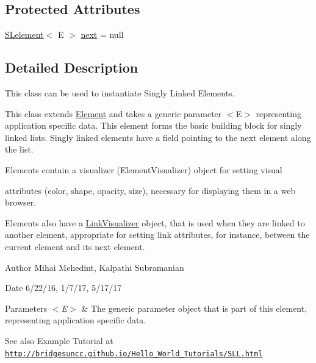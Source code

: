 \subsection*{Protected Attributes}
\begin{DoxyCompactItemize}
\item 
\hyperlink{classbridges_1_1base_1_1_s_lelement}{S\+Lelement}$<$ E $>$ \hyperlink{classbridges_1_1base_1_1_s_lelement_abf61c96a74ad319d561c6952ea388e0e}{next} = null
\end{DoxyCompactItemize}


\subsection{Detailed Description}
This class can be used to instantiate Singly Linked Elements. 

This class extends \hyperlink{classbridges_1_1base_1_1_element}{Element} and takes a generic parameter $<$\+E$>$ representing application specific data. This element forms the basic building block for singly linked lists. Singly linked elements have a field pointing to the next element along the list.

\begin{DoxyVerb}Elements contain a visualizer (ElementVisualizer) object for setting visual
\end{DoxyVerb}
 attributes (color, shape, opacity, size), necessary for displaying them in a web browser.

Elements also have a \hyperlink{classbridges_1_1base_1_1_link_visualizer}{Link\+Visualizer} object, that is used when they are linked to another element, appropriate for setting link attributes, for instance, between the current element and its next element.

\begin{DoxyAuthor}{Author}
Mihai Mehedint, Kalpathi Subramanian
\end{DoxyAuthor}
\begin{DoxyDate}{Date}
6/22/16, 1/7/17, 5/17/17
\end{DoxyDate}

\begin{DoxyParams}{Parameters}
{\em $<$\+E$>$} & The generic parameter object that is part of this element, representing application specific data.\\
\hline
\end{DoxyParams}
\begin{DoxySeeAlso}{See also}
Example Tutorial at ~\newline
 \href{http://bridgesuncc.github.io/Hello_World_Tutorials/SLL.html}{\tt http\+://bridgesuncc.\+github.\+io/\+Hello\+\_\+\+World\+\_\+\+Tutorials/\+S\+L\+L.\+html} 
\end{DoxySeeAlso}


